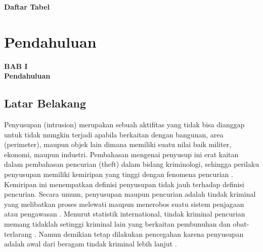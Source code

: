 \documentclass[12pt]{article}
\begin{document}


\newpage

	\begin{center}
		\textbf{{\large Daftar Tabel}}
	\end{center}


\newpage
\thispagestyle{plain}
\mbox{}


\newpage

	\setcounter{page}{9}

	\setcounter{section}{0}
	
	\setcounter{figure}{0}
	
	\section{Pendahuluan}
	
	\begin{center}
		{\large \textbf{BAB I}} \\
		{\large \textbf{Pendahuluan}}
	\end{center}
	
	\subsection{Latar Belakang}
	
	Penyusupan (intrusion) merupakan sebuah aktifitas yang tidak bisa dianggap untuk tidak mungkin terjadi apabila berkaitan dengan bangunan, area (perimeter), maupun objek lain dimana memiliki suatu nilai baik militer, ekonomi, maupun industri\cite{Assets}.
	Pembahasan mengenai penyusup ini erat kaitan dalam pembahasan pencurian (theft) dalam bidang kriminologi, sehingga perilaku penyusupan memiliki kemiripan yang tinggi dengan fenomena pencurian \cite{Felson1998}.
	Kemiripan ini menempatkan definisi penyusupan tidak jauh terhadap definisi pencurian. Secara umum, penyusupan maupun pencurian adalah tindak kriminal yang melibatkan proses melewati maupun menerobos suatu sistem penjagaan atau pengawasan \cite{Chapman}.
	Menurut statistik international, tindak kriminal pencurian memang tidaklah setinggi kriminal lain yang berkaitan pembunuhan dan obat-terlarang \cite{Frate2010}.
	Namun demikian tetap dilakukan pencegahan karena penyusupan adalah awal dari beragam tindak kriminal lebih lanjut \cite{Nesbit}.
	
\end{document}
